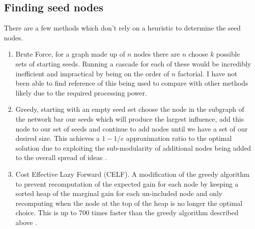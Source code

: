 \documentclass{article}
\begin{document}
\subsection{Finding seed nodes}
There are a few methods which don't rely on a heuristic to determine the seed nodes.

\begin{enumerate}
	\item Brute Force, for a graph made up of $n$ nodes there are $n$ choose $k$ possible sets of starting seeds. Running a cascade for each of these would be incredibly inefficient and impractical by being on the order of $n$ factorial. I have not been able to find reference of this being used to compare with other methods likely due to the required processing power.
	\item Greedy, starting with an empty seed set choose the node in the subgraph of the network bar our seeds which will produce the largest influence, add this node to our set of seeds and continue to add nodes until we have a set of our desired size. This achieves a $1-1/e$ approximation ratio to the optimal solution due to exploiting the sub-modularity of additional nodes being added to the overall spread of ideas \cite{tardoskempe2003}.
	\item Cost Effective Lazy Forward (CELF). A modification of the greedy algorithm to prevent recomputation of the expected gain for each node by keeping a sorted heap of the marginal gain for each un-included node and only recomputing when the node at the top of the heap is no longer the optimal choice. This is up to 700 times faster than the greedy algorithm described above \cite{celf}.
\end{enumerate}
\end{document}

